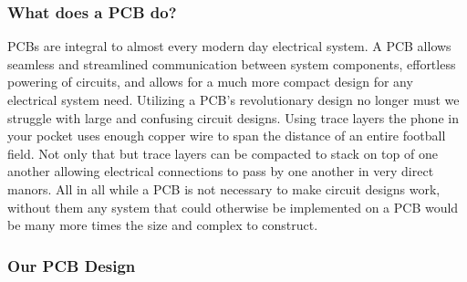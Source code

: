 \subsubsection{What does a PCB do?}
PCBs are integral to almost every modern day electrical system. A PCB allows seamless and streamlined communication between system components, effortless powering of circuits, and allows for a much more compact design for any electrical system need. Utilizing a PCB's revolutionary design no longer must we struggle with large and confusing circuit designs. Using trace layers the phone in your pocket uses enough copper wire to span the distance of an entire football field. Not only that but trace layers can be compacted to stack on top of one another allowing electrical connections to pass by one another in very direct manors. All in all while a PCB is not necessary to make circuit designs work, without them any system that could otherwise be implemented on a PCB would be many more times the size and complex to construct.
\subsubsection{Our PCB Design}

